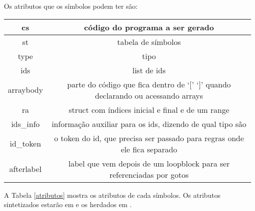 Os atributos que os símbolos podem ter são:
\begin{center}
\begin{tabular}{|c|c|}
\hline
    cs & código do programa a ser gerado\\ \hline
    st & tabela de símbolos \\ \hline
    type & tipo \\ \hline
    ids & list de ids \\ \hline
    arraybody & parte do código que fica dentro de `[' `]' quando declarando ou acessando arrays\\ \hline
    ra & struct com índices inicial e final e de um range \\ \hline
    ids\_info & informação auxiliar para os ids, dizendo de qual tipo são \\ \hline
    id\_token & o token do id, que precisa ser passado para regras onde ele fica separado \\ \hline
    afterlabel & label que vem depois de um loopblock para ser referenciadas por gotos \\ \hline
\end{tabular}
\end{center}


A Tabela \ref{atributos} mostra os atributos de cada símbolos. Os atributos sintetizados estarão em  e os herdados em .

